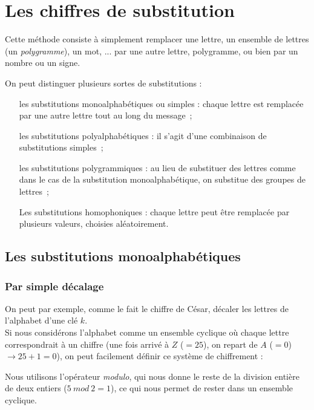 \section{Les chiffres de substitution}
Cette méthode consiste à simplement remplacer une lettre, un ensemble
de lettres (un \emph{polygramme}), un mot, ...  par une autre lettre,
polygramme, ou bien par un nombre ou un signe.

On peut distinguer plusieurs sortes de substitutions : 
\begin{itemize}
  \item[les substitutions monoalphabétiques ou simples] : 
    chaque lettre est remplacée par une autre lettre tout au long du message~; 
  \item[les substitutions polyalphabétiques] :
    il s'agit d'une combinaison de substitutions simples~;
  \item[les substitutions polygrammiques]: 
    au lieu de substituer des lettres comme dans le cas de la substitution
    monoalphabétique, on substitue des groupes de lettres~;
  \item[Les substitutions homophoniques] : 
    chaque lettre peut être remplacée par plusieurs valeurs, choisies
    aléatoirement.
\end{itemize}

\subsection{Les substitutions monoalphabétiques}

\subsubsection{Par simple décalage}
On peut par exemple, comme le fait le chiffre de
César, décaler les lettres de l'alphabet d'une
clé $k$. \\

 Si nous considérons l'alphabet comme un ensemble cyclique où 
chaque lettre correspondrait à un chiffre (une fois arrivé à $Z$ ($= 25$), on 
repart de $A$ ($= 0$) $\rightarrow 25 + 1 = 0$), on peut facilement définir 
ce système de chiffrement :  \\


Nous utilisons l'opérateur \emph{modulo}, qui nous donne le reste de
la division entière de deux entiers ($5~ mod~ 2 = 1$), ce qui nous
permet de rester dans un ensemble cyclique. \\

